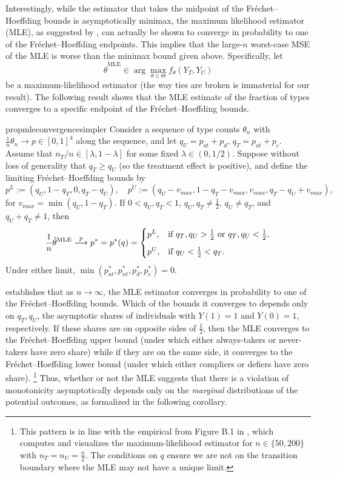 \documentclass[12pt,reqno]{amsart}
\theoremstyle{theorem}
\theoremstyle{definition}
\newcommand{\0}{\mathbf{0}}
\newcommand{\1}{\mathbf{1}}
\begin{document}
Interestingly, while the estimator that takes the midpoint of the Fr\'echet--Hoeffding bounds is asymptotically minimax, the maximum likelihood estimator (MLE), as suggested by \citet{christy_counting_2025}, can actually be shown to converge in probability to one of the Fr\'echet--Hoeffding endpoints. This implies that the large-$n$ worst-case MSE of the MLE is worse than the minimax bound given above. Specifically, let
\[
\hat{\theta}^{\text{MLE}} \in \arg\max_{\theta \in \Theta} f_\theta(Y_T, Y_U)
\]
be a maximum-likelihood estimator (the way ties are broken is immaterial for our result). The following result shows that the MLE estimate of the fraction of types converges to a specific endpoint of the Fr\'echet--Hoeffding bounds.

\begin{restatable}{prop}{mleconvergencesimpler}
\label{prop:mleconvergencesimpler}
Consider a sequence of type counts $\theta_n$ with $\tfrac{1}{n} \theta_n \rightarrow p
\in [0,1]^4$ along the sequence, and let $q_U = p_{at} + p_{d}$, $q_T = p_{at} + p_c$.
Assume that $n_T/n \in [\lambda, 1-\lambda]$ for some fixed $\lambda \in (0, 1/2)$. 
Suppose without loss of generality that $q_T \geq q_U$ (so the treatment
effect is positive), and define the limiting Fr\'echet--Hoeffding bounds by $$p^L := (q_U, 1{-}q_T, 0, q_T {-} q_U),  \quad p^U := (q_U{-}v_{max}, 1{-}q_T{-}v_{max}, v_{max}, q_T {-} q_U {+} v_{max}),$$ for $v_{max} = \min(q_U,1{-}q_T)$. If $0 {<} q_U,q_T {<} 1$, $q_U, q_T \neq \tfrac{1}{2}$, $q_U \neq q_T$, and $q_U {+} q_T \neq 1$, then
\[
\frac{1}{n}\hat{\theta}^{\mathrm{MLE}}
\overset{p}{\longrightarrow}  p^* = p^*(q) =
\begin{cases}
p^L,
& \text{if } q_T, q_U > \tfrac{1}{2} \text{ or } q_T, q_U < \tfrac{1}{2}, \\[6pt]
p^U,
& \text{if } q_U < \tfrac{1}{2} < q_T.
\end{cases}
\]
Under either limit, $\min(p^*_{at},p^*_{nt},p^*_d,p^*_c) = 0$.
\end{restatable}

 establishes that as $n \to \infty$, the MLE estimator converges in probability to one of the Fr\'echet--Hoeffding bounds. Which of the bounds it converges to depends only on $q_T,q_U$, the asymptotic shares of individuals with $Y(1)=1$ and $Y(0)=1$, respectively. If these shares are on opposite sides of $\frac{1}{2}$, then the MLE converges to the Fr\'echet--Hoeffding upper bound (under which either always-takers or never-takers have zero share) while if they are on the same side, it converges to the Fr\'echet--Hoeffding lower bound (under which either compliers or defiers have zero share).%
\footnote{
    This pattern is in line with the empirical from Figure B.1 in \citet{christy_counting_2025}, which computes and visualizes the maximum-likelihood estimator for $n \in \{50,200\}$ with $n_T = n_U = \tfrac{n}{2}$. The conditions on $q$ ensure we are not on the transition boundary where the MLE may not have a unique limit.}
Thus, whether or not the MLE suggests that there is a violation of monotonicity asymptotically depends only on the \emph{marginal} distributions of the potential outcomes, as formalized in the following corollary.
\end{document}
